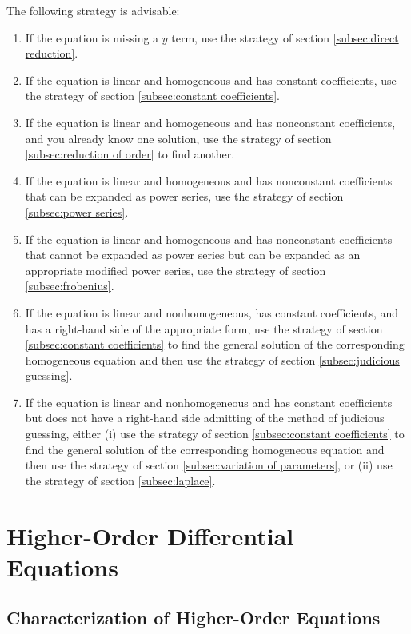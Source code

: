 \documentclass{myart}
\begin{document}
The following strategy is advisable:
\begin{enumerate}
\item If the equation is missing a $y$ term, use the strategy of section \ref{subsec:direct reduction}.
\item If the equation is linear and homogeneous and has constant coefficients, use the strategy of section \ref{subsec:constant coefficients}.
\item If the equation is linear and homogeneous and has nonconstant coefficients, and you already know one solution, use the strategy of section \ref{subsec:reduction of order} to find another.
\item If the equation is linear and homogeneous and has nonconstant coefficients that can be expanded as power series, use the strategy of section \ref{subsec:power series}.
\item If the equation is linear and homogeneous and has nonconstant coefficients that cannot be expanded as power series but can be expanded as an appropriate modified power series, use the strategy of section \ref{subsec:frobenius}.
\item If the equation is linear and nonhomogeneous, has constant coefficients, and has a right-hand side of the appropriate form, use the strategy of section \ref{subsec:constant coefficients} to find the general solution of the corresponding homogeneous equation and then use the strategy of section \ref{subsec:judicious guessing}.
\item If the equation is linear and nonhomogeneous and has constant coefficients but does not have a right-hand side admitting of the method of judicious guessing, either (i) use the strategy of section \ref{subsec:constant coefficients} to find the general solution of the corresponding homogeneous equation and then use the strategy of section \ref{subsec:variation of parameters}, or (ii) use the strategy of section \ref{subsec:laplace}.
\end{enumerate}

\section{Higher-Order Differential Equations} \label{sec:higher order}

\subsection{Characterization of Higher-Order Equations} \label{subsec:higher order characterization}
\end{document}
